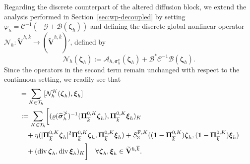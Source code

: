 \documentclass[fleqn,a4paper]{cas-sc}
\newcommand\vdiv{\mathop{\mathrm{div}}\nolimits}
\newcommand{\bxi}{\boldsymbol{\xi}}
\newcommand{\bzeta}{\boldsymbol{\zeta}}
\newcommand{\bPi}{\boldsymbol{\Pi}}
\newcommand{\0}{\boldsymbol{0}}
\newcommand\cC{\mathcal{C}}
\newcommand\cG{\mathcal{G}}
\newcommand\cT{\mathcal{T}}
\newcommand\cN{\mathcal{N}}
\newcommand\bV{\mathbf{V}}
\newcommand\rF{\mathrm{F}}
\newcommand\bbPi{\mathbb{\Pi}}
\newcommand\bOne{\mathbf{1}}
\newcommand\bsigma{\boldsymbol{\sigma}}
\numberwithin{equation}{section}
\numberwithin{figure}{section}
\begin{document}
{Regarding the discrete counterpart of the altered diffusion block, we extend the analysis performed in Section~\ref{sec:wp-decoupled} by setting $\varphi_h = \cC^{-1}(-\cG + \mathcal{B}(\bzeta_h))$ and defining the discrete global nonlinear operator $\cN_h:\widetilde{\bV}^{h,\overline{k}} \to (\widetilde{\bV}^{h,\overline{k}})'$, defined by
\begin{equation*} %
    \cN_h(\bzeta_h) := \mathcal{A}_{h,\bsigma_h^\bbPi}(\bzeta_h) + \mathcal{B}^* \cC^{-1} \mathcal{B}(\bzeta_h).
\end{equation*}
Since the operators in the second term remain unchanged with respect to the continuous setting, we readily see that
\begin{align*} %
    [\cN_h(\bzeta_h), \bxi_h] &= \sum_{K\in \cT_h} [\cN_h^K(\bzeta_h), \bxi_h]\notag \\
    &:= \sum_{K\in \cT_h} \biggl[ (\varrho(\widehat{\bsigma}_h^{\bbPi})^{-1}(\bPi_{\overline{k}}^{0,K}\bzeta_h),\bPi_{\overline{k}}^{0,K}\bxi_h)_K \notag \\
    &\quad + \eta(|\bPi_{\overline{k}}^{0,K}\bzeta_h|^{2}\bPi_{\overline{k}}^{0,K}\bzeta_h, \bPi_{\overline{k}}^{0,K}\bxi_h) + S_3^{\rF,K}((\bOne - \bPi_{\overline{k}}^{0,K})\bzeta_h,(\bOne - \bPi_{\overline{k}}^{0,K})\bxi_h) \notag\\
    &\quad + (\vdiv \bzeta_h, \vdiv \bxi_h)_K\bigg] \quad \forall \bzeta_h, \bxi_h \in \widetilde{\bV}^{h,\overline{k}}.
\end{align*}
}
\end{document}

